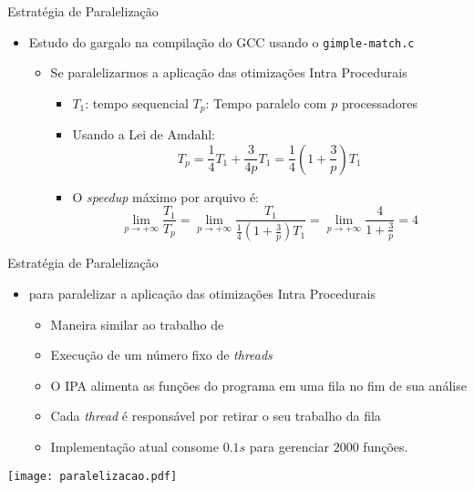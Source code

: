 \begin{frame}{Estratégia de Paralelização}
    \begin{itemize}
        \item Estudo do gargalo na compilação do GCC usando o \texttt{gimple-match.c}
            \begin{itemize}
                \item Se paralelizarmos a aplicação das otimizações Intra Procedurais
            \begin{itemize}
                \item $T_1$: tempo sequencial \hfil\hfil $T_p$: Tempo paralelo com $p$ processadores
                \item Usando a Lei de Amdahl:
$$ T_p = \frac{1}{4} T_1 + \frac{3}{4p}T_1 = \frac{1}{4} \left( 1 + \frac{3}{p}
\right)T_1 $$ 
                \item O \textit{speedup} máximo por arquivo é: $$
\lim_{p \rightarrow +\infty} \frac{T_1}{T_p} = \lim_{p \rightarrow +\infty}
\frac{T_1}{\frac{1}{4} \left( 1 + \frac{3}{p} \right)T_1} = \lim_{p \rightarrow
+\infty} \frac{4}{1 + \frac{3}{p}} = 4$$
            \end{itemize}
            \end{itemize}
    \end{itemize}
\end{frame}


\begin{frame}{Estratégia de Paralelização}
    \begin{itemize}
        \item {\color{blue}{Estratégia corrente}} para paralelizar a aplicação das otimizações Intra Procedurais
            \begin{itemize}
                \item Maneira similar ao trabalho de \cite{wortman1992}
                \item Execução de um número fixo de \textit{threads}
                \item O IPA alimenta as funções do programa em uma fila no fim de sua análise
                \item Cada \textit{thread} é responsável por retirar o seu trabalho da fila
                \item Implementação atual consome $0.1s$ para gerenciar $2000$ funções.
    \end{itemize}
\end{itemize}

 \centering
 \texttt{[image: paralelizacao.pdf]}
\end{frame}

